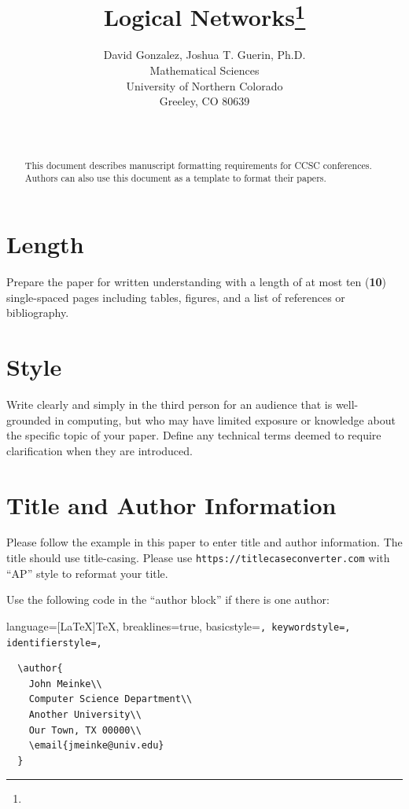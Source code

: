 \documentclass{article}
\title{Logical Networks\footnote{\protect}
}
\author{
David Gonzalez\affmark[1], Joshua T. Guerin, Ph.D.\affmark[2]\\
Mathematical Sciences\\
University of Northern Colorado\\
Greeley, CO 80639\\
\affmark[1]\email{********@bears.unco.edu}\\
\affmark[2]\email{********@unco.edu}\\
}
\begin{document}
\maketitle

\begin{abstract}
This document describes manuscript formatting requirements for CCSC conferences.
Authors can also use this document as a template to format their papers.
\end{abstract}

\section{Length}
Prepare the paper for written understanding with a length of at most ten
(\textbf{10}) single-spaced pages including tables, figures, and a list of references or
bibliography.

\section{Style}
Write clearly and simply in the third person for an audience that is
well-grounded in computing, but who may have limited exposure or knowledge about
the specific topic of your paper. Define any technical terms deemed to require
clarification when they are introduced.

\section{Title and Author Information}
Please follow the example in this paper to enter title and author information.
The title should use title-casing. Please use \texttt{https://titlecaseconverter.com}
with ``AP'' style to reformat your title.

Use the following code in the ``author block'' if there is one author:

\lstset
{
    language=[LaTeX]TeX,
    breaklines=true,
    basicstyle=\tt\scriptsize,
    keywordstyle=\color{blue},
    identifierstyle=\color{magenta},
}

\begin{lstlisting}
  \author{
    John Meinke\\
    Computer Science Department\\
    Another University\\
    Our Town, TX 00000\\
    \email{jmeinke@univ.edu}
  }
\end{lstlisting}
\end{document}
